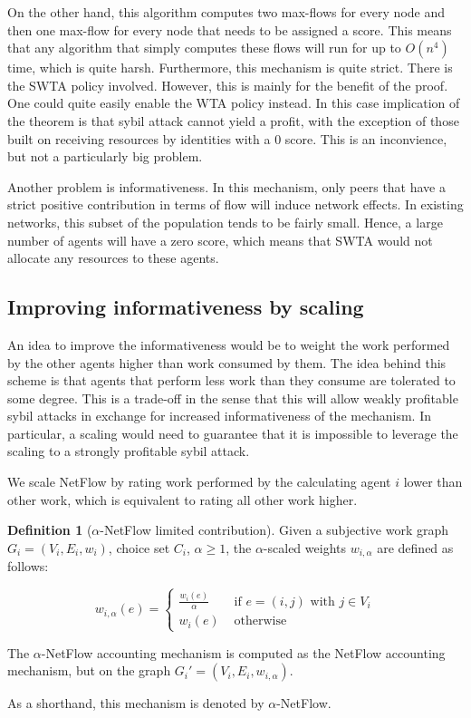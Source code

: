 \documentclass[a4paper,11pt]{book}
\theoremstyle{definition}
\newtheorem{definition}{Definition}
\begin{document}
On the other hand, this algorithm computes two max-flows for every node and then one max-flow for
every node that needs to be assigned a score. This means that any algorithm that simply computes
these flows will run for up to $O(n^4)$ time, which is quite harsh. 
Furthermore, this mechanism is quite strict. There is the SWTA policy involved. However,
this is mainly for the benefit of the proof. One could quite easily enable the WTA policy instead.
In this case implication of the theorem is that sybil attack cannot yield a profit, with the exception
of those built on receiving resources by identities with a $0$ score. This is an inconvience,
but not a particularly big problem. 

Another problem is informativeness. In this mechanism,
only peers that have a strict positive contribution in terms of flow will induce network effects.
In existing networks, this subset of the population tends to be fairly small. Hence, a large
number of agents will have a zero score, which means that SWTA would not allocate any resources
to these agents.

\subsection{Improving informativeness by scaling}
An idea to improve the informativeness would be to weight the work performed by the other
agents higher than work consumed by them. The idea behind this scheme is that agents
that perform less work than they consume are tolerated to some degree. This is a trade-off
in the sense that this will allow weakly profitable sybil attacks in exchange for increased
informativeness of the mechanism. In particular, a scaling would need to guarantee
that it is impossible to leverage the scaling to a strongly profitable sybil attack. 

We scale NetFlow by rating work performed by the calculating agent $i$ lower than other
work, which is equivalent to rating all other work higher.

\begin{definition}[$\alpha$-NetFlow limited contribution]
    Given a subjective work graph $G_i = (V_i, E_i, w_i)$, choice set $C_i$, $\alpha \geq 1$, the $\alpha$-scaled
    weights $w_{i,\alpha}$ are defined as follows:

    \begin{equation*}
        w_{i,\alpha}(e) = 
        \begin{cases}
            \frac{w_i(e)}{\alpha} &\mbox{ if } e = (i, j) \mbox{ with } j \in V_i \\
            w_i(e) &\mbox{ otherwise}
        \end{cases}
    \end{equation*}
    
    The $\alpha$-NetFlow accounting mechanism is computed as the NetFlow accounting
    mechanism, but on the graph $G_i' = (V_i, E_i, w_{i,\alpha})$.

    As a shorthand, this mechanism is denoted by $\alpha$-NetFlow.
\end{definition}
\end{document}
